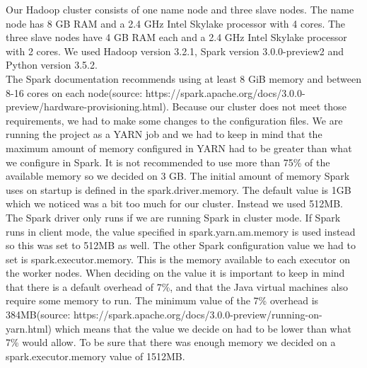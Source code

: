 Our Hadoop cluster consists of one name node and three slave nodes.
The name node has 8 GB RAM and a 2.4 GHz Intel Skylake processor with 4 cores.
The three slave nodes have 4 GB RAM each and a 2.4 GHz Intel Skylake processor with 2 cores.
We used Hadoop version 3.2.1, Spark version 3.0.0-preview2 and Python version 3.5.2.
\\
The Spark documentation recommends using at least 8 GiB memory and between 8-16 cores on each node(source: https://spark.apache.org/docs/3.0.0-preview/hardware-provisioning.html). Because our cluster does not meet those requirements, we had to make some changes to the configuration files. We are running the project as a YARN job and we had to keep in mind that the maximum amount of memory configured in YARN had to be greater than what we configure in Spark. It is not recommended to use more than 75\% of the available memory so we decided on 3 GB. The initial amount of memory Spark uses on startup is defined in the spark.driver.memory. The default value is 1GB which we noticed was a bit too much for our cluster. Instead we used 512MB. The Spark driver only runs if we are running Spark in cluster mode. If Spark runs in client mode, the value specified in spark.yarn.am.memory is used instead so this was set to 512MB as well. The other Spark configuration value we had to set is spark.executor.memory. This is the memory available to each executor on the worker nodes. When deciding on the value it is important to keep in mind that there is a default overhead of 7\%, and that the Java virtual machines also require some memory to run. The minimum value of the 7\% overhead is 384MB(source: https://spark.apache.org/docs/3.0.0-preview/running-on-yarn.html) which means that the value we decide on had to be lower than what 7\% would allow. To be sure that there was enough memory we decided on a spark.executor.memory value of 1512MB.